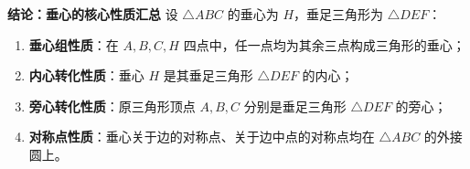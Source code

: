 \begin{statementbox}
\textbf{结论：垂心的核心性质汇总}
设 $\triangle ABC$ 的垂心为 $H$，垂足三角形为 $\triangle DEF$：
\begin{enumerate}
    \item \textbf{垂心组性质}：在 $A, B, C, H$ 四点中，任一点均为其余三点构成三角形的垂心；
    \item \textbf{内心转化性质}：垂心 $H$ 是其垂足三角形 $\triangle DEF$ 的内心；
    \item \textbf{旁心转化性质}：原三角形顶点 $A, B, C$ 分别是垂足三角形 $\triangle DEF$ 的旁心；
    \item \textbf{对称点性质}：垂心关于边的对称点、关于边中点的对称点均在 $\triangle ABC$ 的外接圆上。
\end{enumerate}
\end{statementbox}